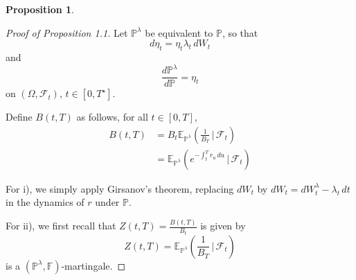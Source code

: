 \documentclass[10pt, oneside, reqno]{amsbook}
\theoremstyle{plain}%
\newtheorem{prop}[thm]{Proposition}
\theoremstyle{definition}
\theoremstyle{remark}
\newcommand{\given}{ \, | \,}
\newcommand{\sigf}{\mathcal{F}}
\newcommand{\E}{\mathbb{E}}
\renewcommand{\P}{\mathbb{P}}
\newcommand{\F}{\mathbb{F}}
\numberwithin{equation}{chapter}
\begin{document}
\begin{prop}
	\label{prop:proposition_1.1}
\end{prop}

\begin{proof}[Proof of Proposition 1.1]
	Let $\P^\lambda$ be equivalent to $\P$, so that \[
		d\eta_t = \eta_t \lambda_t \, dW_t
	\]  and \[
		\frac{d\P^\lambda}{d \P} = \eta_t
	\] on $(\Omega, \sigf_t)$, $t \in [0, T^\star]$.

	Define $B(t, T)$ as follows, for all $t \in [0, T]$, \begin{align*}
		B(t, T) &= B_t \E_{\P^\lambda} \left( \frac{1}{B_T} \given \sigf_t \right) \\
		&= \E_{\P^\lambda} \left(e^{-\int_t^T r_u \, du} \given \sigf_t \right)
	\end{align*}
	
	For i), we simply apply Girsanov's theorem, replacing $dW_t$ by $dW_t = dW^\lambda_t - \lambda_t \, dt$ in the dynamics of $r$ under $\P$.  
	
	For ii), we first recall that $Z(t, T) = \frac{B(t, T)}{B_t}$ is given by \[
		Z(t, T) = \E_{\P^\lambda} \left( \frac{1}{B_T} \given \sigf_t \right)
	\] is a $(\P^\lambda, \F)$-martingale.
	

\end{proof}
\end{document}
